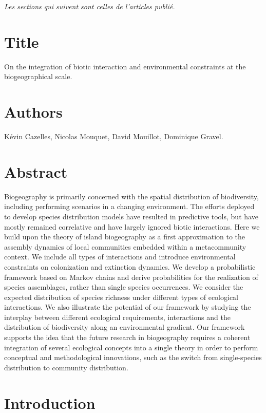 \emph{Les sections qui suivent sont celles de l'articles publié.}

\newpage

\section{Title}

On the integration of biotic interaction and environmental constraints at the biogeographical scale.

\section{Authors}

Kévin Cazelles, Nicolas Mouquet, David Mouillot, Dominique Gravel.


\section{Abstract}

Biogeography is primarily concerned with the spatial distribution of biodiversity, including performing scenarios in a changing environment. The efforts deployed to develop species distribution models have resulted in predictive tools, but have mostly remained correlative and have largely ignored biotic interactions. Here we build upon the theory of island biogeography as a first approximation to the assembly dynamics of local communities embedded within a metacommunity context. We include all types of interactions and introduce environmental constraints on colonization and extinction dynamics. We develop a probabilistic framework based on Markov chains and derive probabilities for the realization of species assemblages, rather than single species occurrences. We consider the expected distribution of species richness under different types of ecological interactions. We also illustrate the potential of our framework by studying the interplay between different ecological requirements, interactions and the distribution of biodiversity along an environmental gradient. Our framework supports the idea that the future research in biogeography requires a coherent integration of several ecological concepts into a single theory in order to perform conceptual and methodological innovations, such as the switch from single-species distribution to community distribution.


\section{Introduction}

